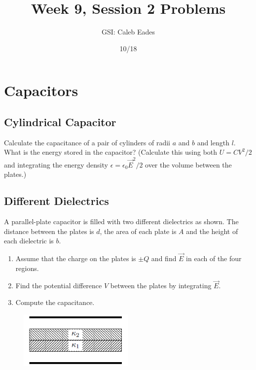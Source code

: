 \documentclass{article}
\begin{document}
\title{Week 9, Session 2 Problems}
\author{GSI: Caleb Eades}
\date{10/18}
\maketitle

\section{Capacitors}

\subsection{Cylindrical Capacitor}

Calculate the capacitance of a pair of cylinders of radii $a$ and $b$ and length $l$. What is the energy stored in the capacitor? (Calculate this using both $U=CV^2/2$ and integrating the energy density $\epsilon=\epsilon_0\vec{E}^2/2$ over the volume between the plates.)

\subsection{Different Dielectrics}

A parallel-plate capacitor is filled with two different dielectrics as shown. The distance between the plates is $d$, the area of each plate is $A$ and the height of each dielectric is $b$.
\begin{enumerate}
	\item Assume that the charge on the plates is $\pm Q$ and find $\vec{E}$ in each of the four regions.
	\item Find the potential difference $V$ between the plates by integrating $\vec{E}$. 
	\item Compute the capacitance.
\end{enumerate}
\begin{figure}
	\begin{center}
	\includegraphics[width=0.5\textwidth]{MixedDielectrics.png}
	\end{center}
\end{figure}
\end{document}
